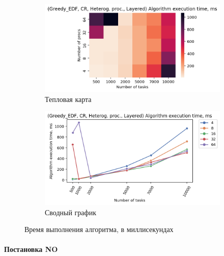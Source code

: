 \begin{figure}[!htbp]
    \centering
    \begin{subfigure}{0.49\textwidth}
        \includegraphics[width=\textwidth]{imgs/unbalanced/CR_EDF/et_heatmap.png}
        \caption{Тепловая карта}
        \label{fig:CR-unbalanced-EDF-exec-time-heatmap}
    \end{subfigure}
    \hfill
    \begin{subfigure}{0.49\textwidth}
        \includegraphics[width=\textwidth]{imgs/unbalanced/CR_EDF/tr_graph.png}
        \caption{Сводный график}
        \label{fig:CR-unbalanced-EDF-exec-time-compiled}
    \end{subfigure}
    \caption{Время выполнения алгоритма, в миллисекундах}
\end{figure}

\paragraph{Постановка NO}

